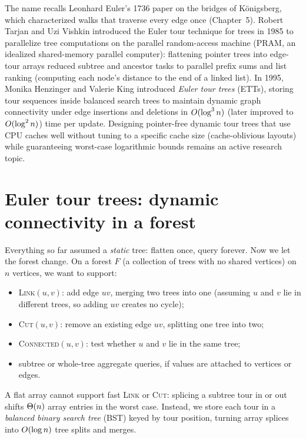 \begin{historybox}
The name recalls Leonhard Euler's 1736 paper on the bridges of K\"onigsberg, which characterized walks that traverse every edge once (Chapter~5). Robert Tarjan and Uzi Vishkin introduced the Euler tour technique for trees in 1985 to parallelize tree computations on the parallel random-access machine (PRAM, an idealized shared-memory parallel computer): flattening pointer trees into edge-tour arrays reduced subtree and ancestor tasks to parallel prefix sums and list ranking (computing each node's distance to the end of a linked list). In 1995, Monika Henzinger and Valerie King introduced \emph{Euler tour trees} (ETTs), storing tour sequences inside balanced search trees to maintain dynamic graph connectivity under edge insertions and deletions in $O(\log^3 n)$ (later improved to $O(\log^2 n)$) time per update. Designing pointer-free dynamic tour trees that use CPU caches well without tuning to a specific cache size (cache-oblivious layouts) while guaranteeing worst-case logarithmic bounds remains an active research topic.
\end{historybox}

\section{Euler tour trees: dynamic connectivity in a forest}
\label{ch21:ett}

Everything so far assumed a \emph{static} tree: flatten once, query forever. Now we
let the forest change. On a forest $F$ (a collection of trees with no shared vertices) on $n$ vertices, we want to support:
\begin{itemize}
\item \textsc{Link}$(u,v)$: add edge $uv$, merging two trees into one (assuming
$u$ and $v$ lie in different trees, so adding $uv$ creates no cycle);
\item \textsc{Cut}$(u,v)$: remove an existing edge $uv$, splitting one tree into two;
\item \textsc{Connected}$(u,v)$: test whether $u$ and $v$ lie in the same tree;
\item subtree or whole-tree aggregate queries, if values are attached to vertices or edges.
\end{itemize}
A flat array cannot support fast \textsc{Link} or \textsc{Cut}: splicing a subtree tour in or out shifts $\Theta(n)$ array entries in the worst case. Instead, we store each tour in a \emph{balanced binary search tree} (BST) keyed
by tour position, turning array splices into $O(\log n)$ tree splits and merges.

